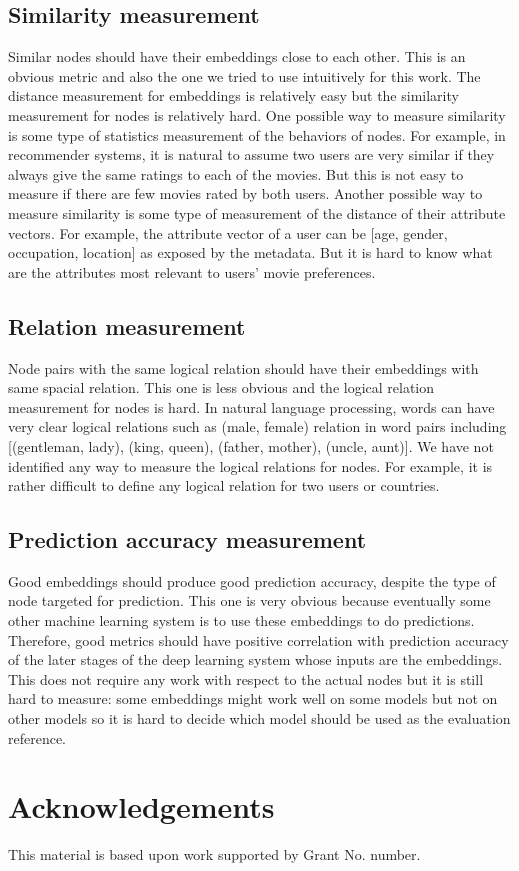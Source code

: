 \documentclass[conference]{IEEEtran}
\begin{document}
\subsection{Similarity measurement}
Similar nodes should have their embeddings close to each other.
This is an obvious metric and also the one we tried to use intuitively for this work.
The distance measurement for embeddings is relatively easy but the similarity measurement for nodes is relatively hard.
One possible way to measure similarity is some type of statistics measurement of the behaviors of nodes.
For example, in recommender systems, it is natural to assume two users are very similar if they always give the same ratings to each of the movies.
But this is not easy to measure if there are few movies rated by both users.
Another possible way to measure similarity is some type of measurement of the distance of their attribute vectors.
For example, the attribute vector of a user can be [age, gender, occupation, location] as exposed by the metadata.
But it is hard to know what are the attributes most relevant to users' movie preferences.

\subsection{Relation measurement}
Node pairs with the same logical relation should have their embeddings with same spacial relation.
This one is less obvious and the logical relation measurement for nodes is hard.
In natural language processing, words can have very clear logical relations such as (male, female) relation in word pairs including [(gentleman, lady), (king, queen), (father, mother), (uncle, aunt)].
We have not identified any way to measure the logical relations for nodes.
For example, it is rather difficult to define any logical relation for two users or countries.

\subsection{Prediction accuracy measurement}
Good embeddings should produce good prediction accuracy, despite the type of node targeted for prediction.
This one is very obvious because eventually some other machine learning system is to use these embeddings to do predictions.
Therefore, good metrics should have positive correlation with prediction accuracy of the later stages of the deep learning system whose inputs are the embeddings.
This does not require any work with respect to the actual nodes but it is still hard to measure: some embeddings might work well on some models but not on other models so it is hard to decide which model should be used as the evaluation reference.

\section*{Acknowledgements}
This material is based upon work supported by Grant No. number.



\end{document}

